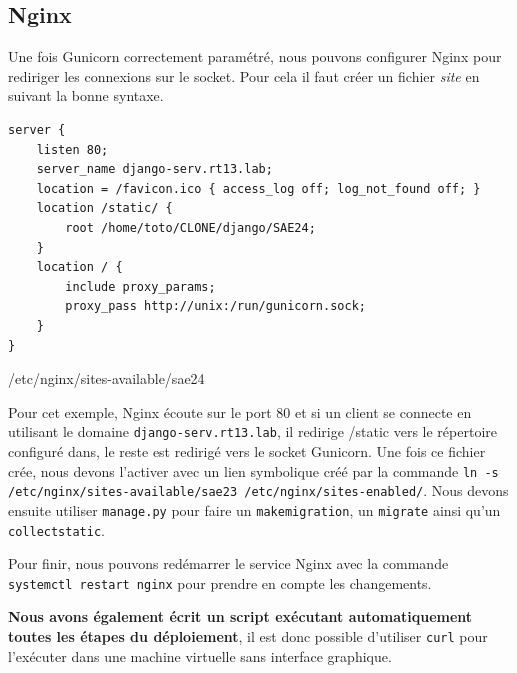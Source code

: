 \documentclass{article}
\begin{document}
    \subsection{Nginx}
    Une fois Gunicorn correctement paramétré, nous pouvons configurer Nginx pour rediriger les connexions sur le socket. Pour cela il faut créer un fichier \emph{site} en suivant la bonne syntaxe.
    \begin{listing}[H]
        \begin{verbatim}
server {
    listen 80;
    server_name django-serv.rt13.lab;
    location = /favicon.ico { access_log off; log_not_found off; }
    location /static/ {
        root /home/toto/CLONE/django/SAE24;
    }
    location / {
        include proxy_params;
        proxy_pass http://unix:/run/gunicorn.sock;
    }
}
        \end{verbatim}
        \caption{/etc/nginx/sites-available/sae24}
        \label{code:sae23-site} 
    \end{listing}
    Pour cet exemple, Nginx écoute sur le port 80 et si un client se connecte en utilisant le domaine \verb|django-serv.rt13.lab|, il redirige /static vers le répertoire configuré dans, le reste est redirigé vers le socket Gunicorn.
    Une fois ce fichier crée, nous devons l'activer avec un lien symbolique créé par la commande \verb|ln -s /etc/nginx/sites-available/sae23 /etc/nginx/sites-enabled/|.
    Nous devons ensuite utiliser \verb|manage.py| pour faire un \verb|makemigration|, un \verb|migrate| ainsi qu'un \verb|collectstatic|.

    Pour finir, nous pouvons redémarrer le service Nginx avec la commande \verb|systemctl restart nginx| pour prendre en compte les changements. 
    
    {\bf Nous avons également écrit un script exécutant automatiquement toutes les étapes du déploiement}, il est donc possible d'utiliser \verb|curl| pour l'exécuter dans une machine virtuelle sans interface graphique.
\end{document}
